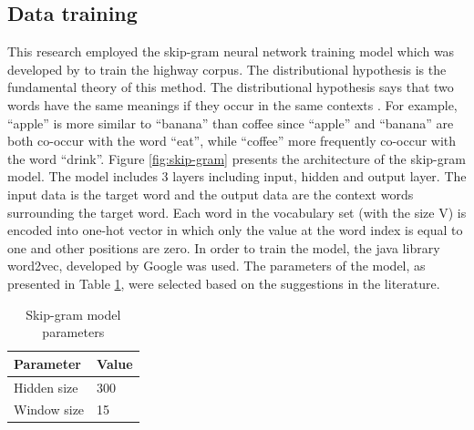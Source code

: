 \documentclass[Journal, InsideFigs, DoubleSpace]{ascelike} %
\begin{document}
\subsection{Data training}
This research employed the skip-gram neural network training model which was developed by \cite{Mikolov13a} to train the highway corpus.  The distributional hypothesis is the fundamental theory of this method. The distributional hypothesis says that two words have the same meanings if they occur in the same contexts \cite{harispe15}. For example, ``apple'' is more similar to ``banana''  than coffee since ``apple'' and ``banana'' are both co-occur with the word ``eat'', while ``coffee'' more frequently co-occur with the word ``drink''. Figure \ref{fig:skip-gram} presents the architecture of the skip-gram model. The model includes 3 layers including input, hidden and output layer. The input data is the target word and the output data are the context words surrounding the target word. Each word in the vocabulary set (with the size V) is encoded into one-hot vector in which only the value at the word index is equal to one and other positions are zero. In order to train the model, the java library word2vec, developed by Google was used. The parameters of the model, as presented in Table \ref{table:nn-parameters}, were selected based on the suggestions in the literature.
%


\begin{table} [t]
\caption{Skip-gram model parameters}
\label{table:nn-parameters}
\centering
\small
\renewcommand{\arraystretch}{1.25}
\begin{tabular}{l l}
\hline
\textbf{Parameter} & \textbf{Value}\\

\hline
Hidden size		&	300\\
Window size	&	15\\

\hline
\end{tabular}
\normalsize
\end{table}
\end{document}
